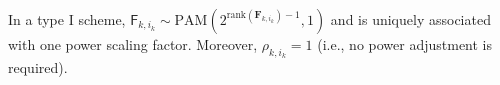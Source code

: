 \documentclass[12pt, draftclsnofoot, onecolumn]{IEEEtran}
\newcommand{\msf}[1]{\mathsf{#1}}
\theoremstyle{definition}
\begin{document}
%


In a type I scheme, $\msf{F}_{k,i_k}\sim \text{PAM}(2^{\text{rank}(\boldsymbol{F}_{k,i_k})-1},1)$ and is uniquely associated with one power scaling factor. Moreover, $\rho_{k,i_k}=1$ (i.e., no power adjustment is required).
\end{document}
